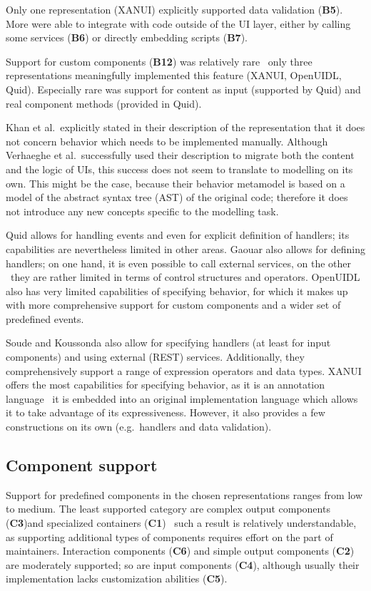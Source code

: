 Only one representation (XANUI) explicitly supported data validation (\textbf{B5}).
More were able to integrate with code outside of the UI layer, either by calling some services (\textbf{B6}) or directly embedding scripts (\textbf{B7}).

Support for custom components (\textbf{B12}) was relatively rare \textendash\ only three representations meaningfully implemented this feature (XANUI, OpenUIDL, Quid).
Especially rare was support for content as input (supported by Quid) and real component methods (provided in Quid).

Khan et al.\ explicitly stated in their description of the representation that it does not concern behavior which needs to be implemented manually.
Although Verhaeghe et al.\ successfully used their description to migrate both the content and the logic of UIs, this success does not seem to translate to modelling on its own.
This might be the case, because their behavior metamodel is based on a model of the abstract syntax tree (AST) of the original code;
therefore it does not introduce any new concepts specific to the modelling task.

Quid allows for handling events and even for explicit definition of handlers; its capabilities are nevertheless limited in other areas.
Gaouar also allows for defining handlers; on one hand, it is even possible to call external services, on the other \textendash\ they are rather limited in terms of control structures and operators.
OpenUIDL also has very limited capabilities of specifying behavior, for which it makes up with more comprehensive support for custom components and a wider set of predefined events.

Soude and Koussonda also allow for specifying handlers (at least for input components) and using external (REST) services.
Additionally, they comprehensively support a range of expression operators and data types.
XANUI offers the most capabilities for specifying behavior, as it is an annotation language \textendash\ it is embedded into an original implementation language which allows it to take advantage of its expressiveness.
However, it also provides a few constructions on its own (e.g.\ handlers and data validation).

\subsection{Component support}\label{subsec:4-2-component-support}
Support for predefined components in the chosen representations ranges from low to medium.
The least supported category are complex output components (\textbf{C3})and specialized containers (\textbf{C1}) \textendash\ such a result is relatively understandable, as supporting additional types of components requires effort on the part of maintainers.
Interaction components (\textbf{C6}) and simple output components (\textbf{C2}) are moderately supported;
so are input components (\textbf{C4}), although usually their implementation lacks customization abilities (\textbf{C5}).


